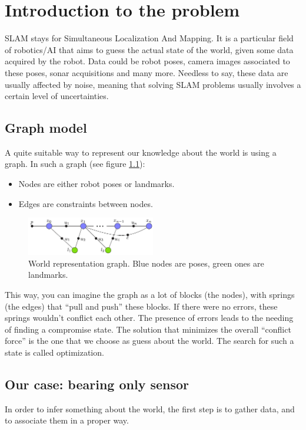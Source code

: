 \chapter{Introduction to the problem}\label{cap:Introduction}
SLAM stays for Simultaneous Localization And Mapping. It is a particular field of robotics/AI that aims to guess the actual state of the world, given some data acquired by the robot.
Data could be robot poses, camera images associated to these poses, sonar acquisitions and many more.
Needless to say, these data are usually affected by noise, meaning that solving SLAM problems usually involves a certain level of uncertainties.

\section{Graph model}
A quite suitable way to represent our knowledge about the world is using a graph.
In such a graph (see figure \ref{fig:graph}):
\begin{itemize}
  \item Nodes are either robot poses or landmarks.
  \item Edges are constraints between nodes.
\end{itemize}
\begin{figure}[htbp]
  \centering
    \includegraphics[width=0.5\textwidth]{images/graph.png}
  \caption{World representation graph. Blue nodes are poses, green ones are landmarks.}
  \label{fig:graph}
\end{figure}
This way, you can imagine the graph as a lot of blocks (the nodes), with springs (the edges) that ``pull and push'' these blocks.
If there were no errors, these springs wouldn't conflict each other. The presence of errors leads to the needing of finding a compromise state.
The solution that minimizes the overall ``conflict force'' is the one that we choose as guess about the world. The search for such a state is called optimization.

\section{Our case: bearing only sensor}
In order to infer something about the world, the first step is to gather data, and to associate them in a proper way.

